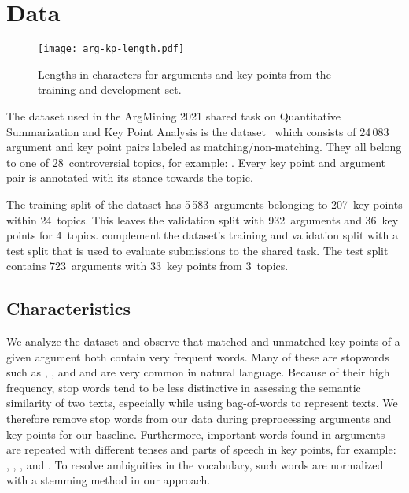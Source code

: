 \section{Data}\label{data}

\begin{figure*}
    \centering
    \texttt{[image: arg-kp-length.pdf]}
    \caption{Lengths in characters for arguments and key points from the training and development set.}
    \label{arg-kp-length}
\end{figure*}

The dataset used in the ArgMining 2021 shared task on Quantitative Summarization and Key Point Analysis is the \ArgKP dataset~\cite{Bar-HaimEFKLS2020} which consists of 24\,083 argument 
and key point pairs labeled as matching/non-matching. They all belong to one of 28~controversial topics, for example: 
. Every key point and argument pair is annotated with its stance towards the topic. 

The training split of the \ArgKP dataset has 5\,583~arguments belonging to 207~key points within 24~topics. This leaves the validation split with 932~arguments and 36~key points for 4~topics.
\citet{kpa-2021-overview} complement the \ArgKP dataset's training and validation split with a test split that is used to evaluate submissions to the shared task. The test split contains 723~arguments with 33~key points from 3~topics.

\subsection{Characteristics}

We analyze the \ArgKP dataset and observe that matched and unmatched key points of a given argument both contain very frequent words. 
Many of these are stopwords such as , , and  and are very common in natural language.
Because of their high frequency, stop words tend to be less distinctive in assessing the semantic similarity of two texts, especially while using bag-of-words to represent texts.
We therefore remove stop words from our data during preprocessing arguments and key points for our baseline. 
Furthermore, important words found in arguments are repeated with different tenses and parts of speech in key points, for example: 
, , , and . 
To resolve ambiguities in the vocabulary, such words are normalized with a stemming method in our approach.

